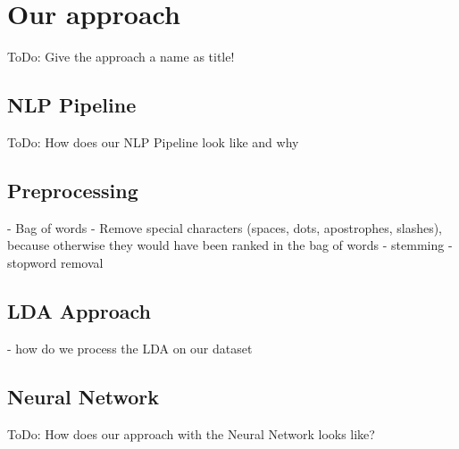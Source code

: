 \section{Our approach} %
\label{sec:own_approach}

\colorbox{yellow!30}{ToDo:} Give the approach a name as title!

\subsection{NLP Pipeline} %
\label{sub:own_pipeline}

\colorbox{yellow!30}{ToDo:} How does our NLP Pipeline look like and why

\subsection{Preprocessing} %
\label{sub:preprocessing}
- Bag of words
- Remove special characters (spaces, dots, apostrophes, slashes), because otherwise they would have been ranked in the bag of words
- stemming
- stopword removal

\subsection{LDA Approach} %
\label{sub:own_lda}
- how do we process the LDA on our dataset

\subsection{Neural Network} %
\label{sub:own_neuralnetwork}

\colorbox{yellow!30}{ToDo:} How does our approach with the Neural Network looks like?
